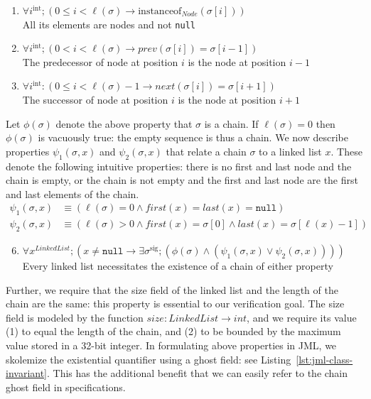 \documentclass[runningheads]{llncs}
\theoremstyle{remark}
\begin{document}
\begin{enumerate}[label=(\alph*)]
    \item\label{item:node} $\forall i^\mathrm{int}; (0\leq i<\ell(\sigma)\to \mathrm{instanceof}_\mathit{Node}(\sigma[i]))$\\
    All its elements are nodes and not \texttt{null}
    \item\label{item:prev} $\forall i^\mathrm{int}; (0<i<\ell(\sigma)\to \mathit{prev}(\sigma[i]) = \sigma[i-1])$\\
    The predecessor of node at position $i$ is the node at position $i-1$
    \item\label{item:next} $\forall i^\mathrm{int}: (0\leq i<\ell(\sigma)-1\to \mathit{next}(\sigma[i]) = \sigma[i+1])$\\
    The successor of node at position $i$ is the node at position $i+1$
\end{enumerate}

Let $\phi(\sigma)$ denote the above property that $\sigma$ is a chain. If $\ell(\sigma)=0$ then $\phi(\sigma)$ is vacuously true: the empty sequence is thus a chain. We now describe properties $\psi_1(\sigma,x)$ and $\psi_2(\sigma,x)$ that relate a chain $\sigma$ to a linked list $x$. These denote the following intuitive properties: there is no first and last node and the chain is empty, or the chain is not empty and the first and last node are the first and last elements of the chain. \begin{equation*}
\begin{split}
\psi_1(\sigma,x) & \equiv (\ell(\sigma) = 0 \land \mathit{first}(x) = \mathit{last}(x) = \mathtt{null}) \\
\psi_2(\sigma,x) & \equiv (\ell(\sigma) > 0 \land \mathit{first}(x) = \sigma[0] \land \mathit{last}(x) = \sigma[\ell(x)-1])
\end{split}
\end{equation*}
\begin{enumerate}\setcounter{enumi}{5}
    \item $\forall x^\mathit{LinkedList}; (x \neq \mathtt{null}\to \exists \sigma^\mathrm{sig}; (\phi(\sigma) \land (\psi_1(\sigma,x)\lor\psi_2(\sigma,x))))$\\
    Every linked list necessitates the existence of a chain of either property
\end{enumerate}

Further, we require that the size field of the linked list and the length of the chain are the same: this property is essential to our verification goal. The size field is modeled by the function $\mathit{size}: \mathit{LinkedList}\to \mathit{int}$, and we require its value (1) to equal the length of the chain, and (2) to be bounded by the maximum value stored in a 32-bit integer. In formulating above properties in JML, we skolemize the existential quantifier using a ghost field: see Listing~\ref{lst:jml-class-invariant}. This has the additional benefit that we can easily refer to the chain ghost field in specifications.
\end{document}
